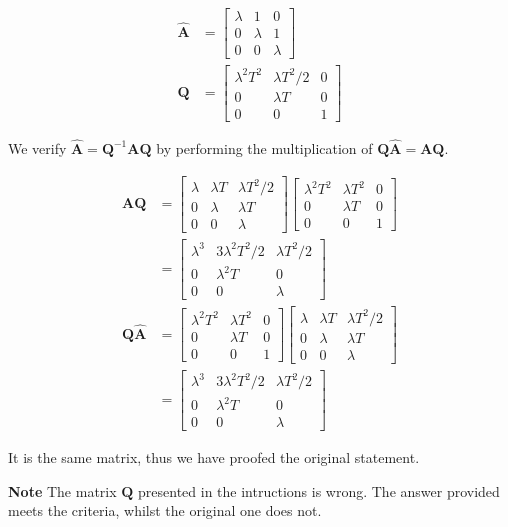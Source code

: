  \begin{align*}
 \hat {\mathbf{A}} &= \begin{bmatrix}
                       \lambda & 1 & 0 \\
                       0 & \lambda & 1 \\
                       0 & 0 & \lambda
                      \end{bmatrix}\\
  \mathbf{Q} &= \begin{bmatrix}
   \lambda^2 T^2 & \lambda T^2 /2& 0\\
      0 & \lambda T & 0\\
      0 & 0 & 1
  \end{bmatrix}
 \end{align*}

 We verify $ \hat{\mathbf{A}}  = \mathbf{Q}^{-1} \mathbf{A} \mathbf{Q} $
 by performing the multiplication of
 $\mathbf{Q} \hat{\mathbf{A}} =  \mathbf{A} \mathbf{Q} $.

 \begin{align*}
  \mathbf{A} \mathbf{Q}  &= \begin{bmatrix}
      \lambda & \lambda T & \lambda T^2 / 2 \\
      0 &\lambda & \lambda T \\
      0 & 0 & \lambda
     \end{bmatrix}
     \begin{bmatrix}
   \lambda^2 T^2 & \lambda T^2 & 0\\
      0 & \lambda T & 0\\
      0 & 0 & 1
  \end{bmatrix}\\
  &= \begin{bmatrix}
      \lambda^3 & 3\lambda^2T^2/2 & \lambda T^2/2\\
      0 & \lambda^2 T & 0\\
      0 & 0 & \lambda
     \end{bmatrix}\\
  \mathbf{Q} \hat{\mathbf{A}} &= \begin{bmatrix}
   \lambda^2 T^2 & \lambda T^2 & 0\\
      0 & \lambda T & 0\\
      0 & 0 & 1
  \end{bmatrix}
  \begin{bmatrix}
      \lambda & \lambda T & \lambda T^2 / 2 \\
      0 &\lambda & \lambda T \\
      0 & 0 & \lambda
     \end{bmatrix}\\
     &= \begin{bmatrix}
      \lambda^3 & 3\lambda^2T^2/2 & \lambda T^2/2\\
      0 & \lambda^2 T & 0\\
      0 & 0 & \lambda
     \end{bmatrix}
 \end{align*}

 It is the same matrix, thus we have proofed the original statement.

 \textbf{Note} The matrix $\mathbf{Q}$ presented in the intructions
 is wrong.
 The answer provided meets the criteria, whilst the original one does not.
